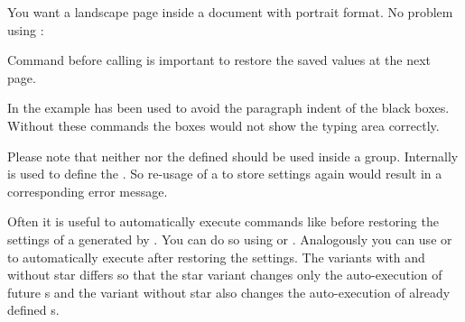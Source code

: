 \begin{Example}
  You want a landscape page inside a document with portrait format. No problem
  using :
  Command  before calling
   is important to restore the saved values at the next
  page.
\end{Example}
In the example  has been used to avoid the paragraph indent of
the black boxes. Without these commands the boxes would not show the 
typing area correctly.

Please note that neither  nor the
defined  should be used inside a group. Internally
 is
used to define the . So re-usage of a
 to store settings again would result in a
corresponding error message.

Often it is useful to automatically
execute commands like  before restoring the settings
of a  generated by . You can do so using
 or . Analogously you can
use  or  to automatically
execute  after restoring the settings. The variants with and
without star differs so that the star variant changes only the auto-execution
 of future s and the variant without star also
changes the auto-execution  of already defined s.
%
%
%
%
%

